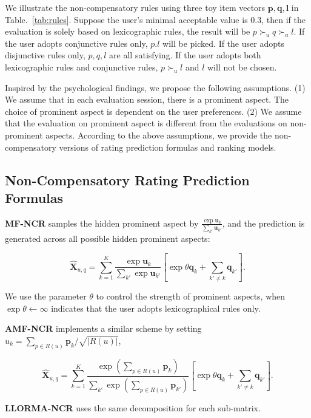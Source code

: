 \documentclass[letterpaper]{article} %
\begin{document}
We illustrate the non-compensatory rules using three toy item vectors $\mathbf{p,q,l}$  in Table.~\ref{tab:rules}. Suppose the user's minimal acceptable value is $0.3$, then if the evaluation is solely based on lexicographic rules, the result will be $p\succ_u q \succ_u l$. If the user adopts conjunctive rules only, $p.l$ will be  picked. If the user adopts disjunctive rules only, $p,q,l$ are all satisfying. If the user adopts both lexicographic rules and conjunctive rules, $p\succ_u l$ and $l$ will not be chosen. 

Inspired by the psychological findings, we propose the following assumptions. (1) We assume that in each evaluation session, there is a prominent aspect. The choice of prominent aspect is dependent on the user preferences. (2) We assume that the evaluation on prominent aspect is different from the evaluations on non-prominent aspects. According to the above assumptions, we provide the non-compensatory versions of rating prediction formulas and ranking models.

\subsection{Non-Compensatory Rating Prediction Formulas}
\textbf{MF-NCR} samples the hidden prominent aspect by $\frac{\exp \mathbf{u}_k}{\sum_{k'} \mathbf{u}_{k'}} $, and the prediction is generated across all possible hidden prominent aspects: 

\begin{equation}\label{equ:MF-NCR}
 \hat{\mathbf{X}}_{u,q}=\sum_{k=1}^{K} \frac{\exp \mathbf{u}_k}{\sum_{k'} \exp \mathbf{u}_{k'}} [ \exp\theta \mathbf{q}_k  + \sum_{k'\neq k} \mathbf{q}_{k'} ].
\end{equation}

We use the parameter $\theta$ to control the strength of prominent aspects, when $\exp\theta \leftarrow \infty$ indicates that the user adopts lexicographical rules only.

\textbf{AMF-NCR} implements a similar scheme by setting $u_k =\sum_{p \in R(u)} \mathbf{p}_k/\sqrt{|R(u)|} $, 

\begin{equation}\label{equ:AMF-NCR}
 \hat{\mathbf{X}}_{u,q}=\sum_{k=1}^{K} \frac{\exp (\sum_{p \in R(u)} \mathbf{p}_k )}{\sum_{k'} \exp  (\sum_{p \in R(u)} \mathbf{p}_{k'} ) } [ \exp\theta \mathbf{q}_k  + \sum_{k'\neq k} \mathbf{q}_{k'} ].
\end{equation}

\textbf{LLORMA-NCR} uses the same decomposition for each sub-matrix.  
\end{document}
